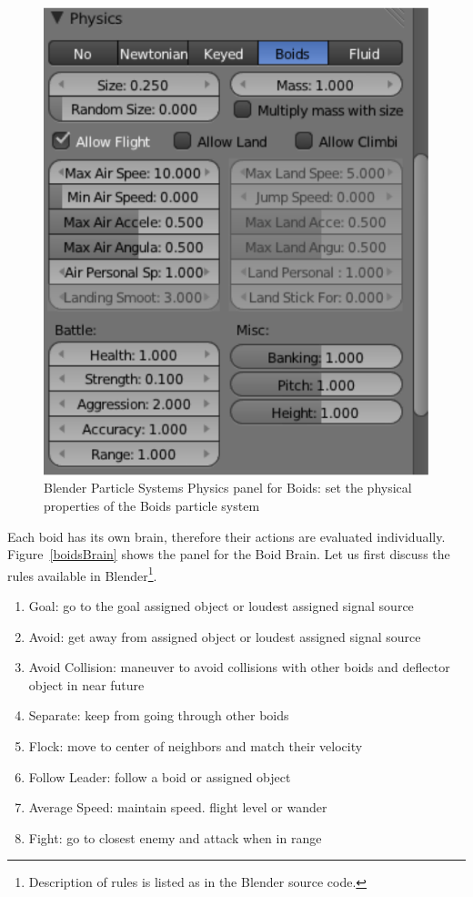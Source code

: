 \begin{figure}[htbp]
\begin{center}
\includegraphics[scale = 0.5]{figures/boidsPhysics.pdf} 
\caption{Blender Particle Systems Physics panel for Boids: set the physical properties of the Boids particle system}
\label{boidsPhysics}
\end{center}
\end{figure}

Each boid has its own brain, therefore their actions are evaluated individually. Figure~\ref{boidsBrain} shows the panel for the Boid Brain. Let us first discuss the rules available in Blender\footnote{Description of rules is listed as in the Blender source code.}.

\begin{enumerate}
\item{Goal: go to the goal assigned object or loudest assigned signal source}
\item{Avoid: get away from assigned object or loudest assigned signal source}
\item{Avoid Collision: maneuver to avoid collisions with other boids and deflector object in near future}
\item{Separate: keep from going through other boids}
\item{Flock: move to center of neighbors and match their velocity}
\item{Follow Leader: follow a boid or assigned object}
\item{Average Speed: maintain speed. flight level or wander}
\item{Fight: go to closest enemy and attack when in range}
\end{enumerate}

